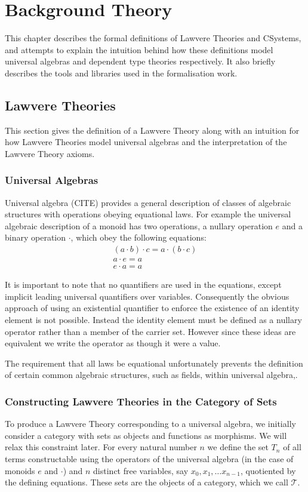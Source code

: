 \chapter{Background Theory}
This chapter describes the formal definitions of Lawvere Theories and CSystems,
and attempts to explain the intuition behind how these definitions model
universal algebras and dependent type theories respectively. It also briefly
describes the tools and libraries used in the formalisation work.

\section{Lawvere Theories}
This section gives the definition of a Lawvere Theory along with an intuition
for how Lawvere Theories model universal algebras and the interpretation of the
Lawvere Theory axioms. 

\subsection{Universal Algebras}
Universal algebra (CITE) provides a general description of classes of algebraic
structures with operations obeying equational laws. For example the universal
algebraic description of a monoid has two operations, a nullary operation $e$
and a binary operation $\cdot$, which obey the following equations:
\begin{gather*}
    (a\cdot b)\cdot c = a\cdot (b\cdot c) \\
    a \cdot e = a \\
    e \cdot a = a
\end{gather*}

It is important to note that no quantifiers are used in the equations, except
implicit leading universal quantifiers over variables. Consequently the obvious
approach of using an existential quantifier to enforce the existence of an
identity element is not possible. Instead the identity element must be defined
as a nullary operator rather than a member of the carrier set. However since
these ideas are equivalent we write the operator as though it were a value.

The requirement that all laws be equational unfortunately prevents the
definition of certain common algebraic structures, such as fields, within
universal algebra,.

\subsection{Constructing Lawvere Theories in the Category of Sets}
To produce a Lawvere Theory corresponding to a universal algebra, we initially
consider a category with sets as objects and functions as morphisms. We will
relax this constraint later. For every natural number $n$ we define the set
$T_n$ of all terms constructable using the operators of the universal algebra
(in the case of monoids $e$ and $\cdot$) and $n$ distinct free variables, say
$x_0, x_1,\ldots x_{n-1}$, quotiented by the defining equations. These sets are
the objects of a category, which we call $\mathcal{T}$.

